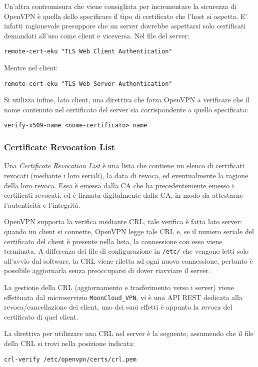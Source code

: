 Un'altra contromisura che viene consigliata per incrementare la sicurezza di OpenVPN
è quella dello specificare il tipo di certificato che l'host si aspetta.
E' infatti ragionevole presuppore che un server dovrebbe aspettarsi solo certificati
demandati all'uso come client e viceversa.
Nel file del server:
\begin{verbatim}
remote-cert-eku "TLS Web Client Authentication"
\end{verbatim}
Mentre nel client:
\begin{verbatim}
remote-cert-eku "TLS Web Server Authentication"
\end{verbatim}


Si utilizza infine, lato client, una direttiva che forza OpenVPN a verificare che
il nome contenuto nel certificato del server sia corrispondente a quello specificato:
\begin{verbatim}
verify-x509-name <nome-certificato> name  
\end{verbatim}


\subsubsection{Certificate Revocation List}
Una \textit{Certificate Revocation List} è una lista che contiene un elenco di certificati
revocati (mediante i loro seriali), la data di revoca, ed eventualmente la ragione della loro revoca.
Essa è emessa dalla CA che ha precedentemente emesso i certificati revocati, ed è firmata digitalmente
dalla CA, in modo da attestarne l'autenticità e l'integrità.

OpenVPN supporta la verifica mediante CRL, tale verifica è fatta lato server: quando
un client si connette, OpenVPN legge tale CRL e, se il numero seriale del certificato
del client è presente nella lista, la connessione con esso viene terminata.
A differenza dei file di configurazione in \texttt{/etc/} che vengono letti solo all'avvio
dal software, la CRL viene riletta ad ogni nuova connessione, pertanto è possibile aggiornarla senza
preoccuparsi di dover riavviare il server.

La gestione della CRL (aggiornamento e trasferimento verso i server) viene effettuata dal microservizio
\texttt{MoonCloud\_VPN}, vi è una API REST dedicata alla revoca/cancellazione dei client, uno
dei suoi effetti è appunto la revoca del certificato di quel client.

La direttiva per utilizzare una CRL nel server è la seguente, assumendo che il file della CRL
si trovi nella posizione indicata:
\begin{verbatim}
crl-verify /etc/openvpn/certs/crl.pem
\end{verbatim}